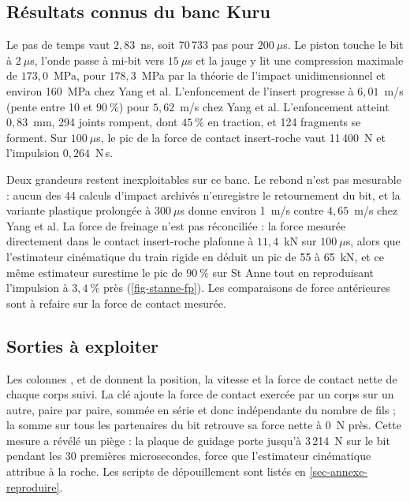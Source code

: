 \subsection{Résultats connus du banc Kuru}

Le pas de temps vaut $2{,}83$~ns, soit 70\,733 pas pour $200~\mu$s. Le piston touche le bit à $2~\mu$s, l'onde passe à mi-bit vers $15~\mu$s et la jauge y lit une compression maximale de $173{,}0$~MPa, pour $178{,}3$~MPa par la théorie de l'impact unidimensionnel et environ 160~MPa chez Yang et al. L'enfoncement de l'insert progresse à $6{,}01$~m/s (pente entre 10 et $90~\%$) pour $5{,}62$~m/s chez Yang et al. L'enfoncement atteint $0{,}83$~mm, 294 joints rompent, dont $45~\%$ en traction, et 124 fragments se forment. Sur $100~\mu$s, le pic de la force de contact insert-roche vaut 11\,400~N et l'impulsion $0{,}264$~N\,s.

Deux grandeurs restent inexploitables sur ce banc. Le rebond n'est pas mesurable : aucun des 44 calculs d'impact archivés n'enregistre le retournement du bit, et la variante plastique prolongée à $300~\mu$s donne environ 1~m/s contre $4{,}65$~m/s chez Yang et al. La force de freinage n'est pas réconciliée : la force mesurée directement dans le contact insert-roche plafonne à $11{,}4$~kN sur $100~\mu$s, alors que l'estimateur cinématique du train rigide en déduit un pic de 55 à 65~kN, et ce même estimateur surestime le pic de $90~\%$ sur St Anne tout en reproduisant l'impulsion à $3{,}4~\%$ près (\cref{fig-stanne-fp}). Les comparaisons de force antérieures sont à refaire sur la force de contact mesurée.

\subsection{Sorties à exploiter}

Les colonnes ,  et  de  donnent la position, la vitesse et la force de contact nette de chaque corps suivi. La clé  ajoute la force de contact exercée par un corps sur un autre, paire par paire, sommée en série et donc indépendante du nombre de fils ; la somme sur tous les partenaires du bit retrouve sa force nette à 0~N près. Cette mesure a révélé un piège : la plaque de guidage porte jusqu'à 3\,214~N sur le bit pendant les $30$ premières microsecondes, force que l'estimateur cinématique attribue à la roche. Les scripts de dépouillement sont listés en \cref{sec-annexe-reproduire}.
